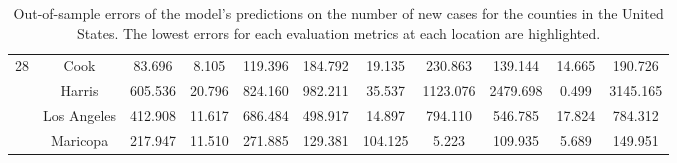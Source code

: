 \begin{landscape}
\begin{table}[!htb]
\begin{tabular}{| c | c | c | c | c | c | c | c | c | c | c |}
        \multirow{4}{*}{28}
            & Cook & 83.696 & 8.105 & 119.396 & 184.792 & 19.135 & 230.863 & 139.144 & 14.665 & 190.726
            \\ \cline{2-11}
            & Harris & 605.536 & 20.796 & 824.160 & 982.211 & 35.537 & 1123.076 & 2479.698 & 0.499 & 3145.165
            \\ \cline{2-11}
            & Los Angeles & 412.908 & 11.617 & 686.484 & 498.917 & 14.897 & 794.110 & 546.785 & 17.824 & 784.312
            \\ \cline{2-11}
            & Maricopa & 217.947 & 11.510 & 271.885 & 129.381 & 104.125 & 5.223 & 109.935 & 5.689 & 149.951
            \\
        \hline
    \end{tabular}
    \caption{Out-of-sample errors of the model's predictions on the number of new cases for the counties in the United States. The lowest errors for each evaluation metrics at each location are highlighted.}
\end{table}
\end{landscape}

